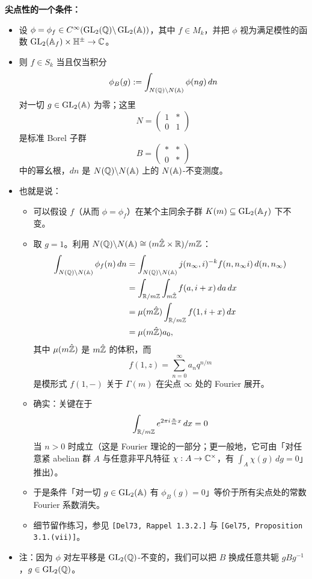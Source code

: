 \textbf{尖点性的一个条件：}
\begin{itemize}
\item 设 $\phi=\phi_f\in C^\infty(\operatorname{GL}_2(\mathbb{Q})\backslash\operatorname{GL}_2(\mathbb{A}))$，其中 $f\in M_k$，并把 $\phi$ 视为满足模性的函数 $\operatorname{GL}_2(\mathbb{A}_f)\times\mathbb{H}^\pm\to\mathbb{C}$。
\item 则 $f\in S_k$ 当且仅当积分
\[
\phi_B(g):=\int_{N(\mathbb{Q})\backslash N(\mathbb{A})}\phi(ng)\,dn
\]
对一切 $g\in\operatorname{GL}_2(\mathbb{A})$ 为零；这里
\[
N=\begin{pmatrix}1&*\\0&1\end{pmatrix}
\]
是标准 Borel 子群
\[
B=\begin{pmatrix}*&*\\0&*\end{pmatrix}
\]
中的幂幺根，$dn$ 是 $N(\mathbb{Q})\backslash N(\mathbb{A})$ 上的 $N(\mathbb{A})$-不变测度。
\item 也就是说：
\begin{itemize}
\item 可以假设 $f$（从而 $\phi=\phi_f$）在某个主同余子群 $K(m)\subseteq\operatorname{GL}_2(\mathbb{A}_f)$ 下不变。
\item 取 $g=1$。利用 $N(\mathbb{Q})\backslash N(\mathbb{A})\cong(m\hat{\mathbb{Z}}\times\mathbb{R})/m\mathbb{Z}$：
\begin{align*}
\int_{N(\mathbb{Q})\backslash N(\mathbb{A})}\phi_f(n)\,dn
&=\int_{N(\mathbb{Q})\backslash N(\mathbb{A})}j(n_\infty,i)^{-k}f(n,n_\infty i)\,d(n,n_\infty)\\
&=\int_{\mathbb{R}/m\mathbb{Z}}\int_{m\hat{\mathbb{Z}}}f(a,i+x)\,da\,dx\\
&=\mu(m\hat{\mathbb{Z}})\int_{\mathbb{R}/m\mathbb{Z}}f(1,i+x)\,dx\\
&=\mu(m\hat{\mathbb{Z}})a_0,
\end{align*}
其中 $\mu(m\hat{\mathbb{Z}})$ 是 $m\hat{\mathbb{Z}}$ 的体积，而
\[
f(1,z)=\sum_{n=0}^\infty a_nq^{n/m}
\]
是模形式 $f(1,-)$ 关于 $\Gamma(m)$ 在尖点 $\infty$ 处的 Fourier 展开。
\item 确实：关键在于
\[
\int_{\mathbb{R}/m\mathbb{Z}}e^{2\pi i\frac nmx}\,dx=0
\]
当 $n>0$ 时成立（这是 Fourier 理论的一部分；更一般地，它可由「对任意紧 abelian 群 $A$ 与任意非平凡特征 $\chi:A\to\mathbb{C}^\times$，有 $\int_A\chi(g)\,dg=0$」推出）。
\item 于是条件「对一切 $g\in\operatorname{GL}_2(\mathbb{A})$ 有 $\phi_B(g)=0$」等价于所有尖点处的常数 Fourier 系数消失。
\item 细节留作练习，参见 \texttt{[Del73, Rappel 1.3.2.]} 与 \texttt{[Gel75, Proposition 3.1.(vii)]}。
\end{itemize}
\item 注：因为 $\phi$ 对左平移是 $\operatorname{GL}_2(\mathbb{Q})$-不变的，我们可以把 $B$ 换成任意共轭 $gBg^{-1}$，$g\in\operatorname{GL}_2(\mathbb{Q})$。
\end{itemize}

